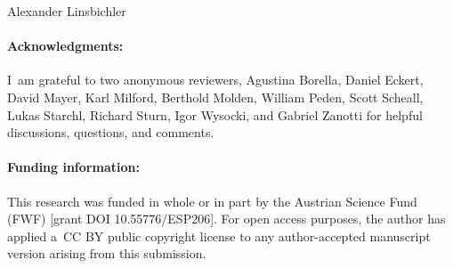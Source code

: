 \begin{artengenv}{Alexander Linsbichler}
\paragraph{Acknowledgments:}
I~am grateful to two anonymous reviewers, Agustina Borella, Daniel Eckert, David Mayer, Karl Milford, Berthold Molden, William Peden, Scott Scheall, Lukas Starchl, Richard Sturn, Igor Wysocki, and Gabriel Zanotti for helpful discussions, questions, and comments.



\paragraph{Funding information:} This research was funded in whole or in part by the Austrian Science Fund (FWF) [grant DOI {10.55776/ESP206}]. For open access purposes, the author has applied a~CC BY public copyright license to any author-accepted manuscript version arising from this submission.

\end{artengenv}

